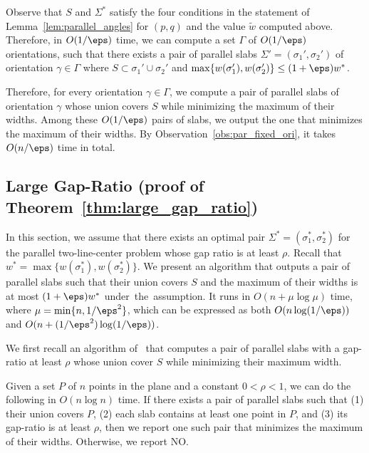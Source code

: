 Observe that $S$ and $\Sigma^*$ satisfy the four conditions in the statement of Lemma~\ref{lem:parallel_angles} for $(p, q)$ and the value $\widetilde w$ computed above.
Therefore, in $O(1/\eps)$ time, we can compute a set $\Gamma$ of $O(1/\eps)$ orientations, such that there exists a pair of parallel slabs $\Sigma' = (\sigma_1', \sigma_2')$  of orientation $\gamma \in \Gamma$ where $S\subset \sigma_1'\cup \sigma_2'$ and $\max \{w(\sigma_1'), w(\sigma_2') \} \le (1+\eps) w^*$.

Therefore, for every orientation $\gamma \in \Gamma$, we compute a pair of parallel slabs of orientation $\gamma$ whose union covers $S$ while minimizing the maximum of their widths. 
Among these $O(1/\eps)$ pairs of slabs, we output the one that minimizes the maximum of their widths.
By Observation~\ref{obs:par_fixed_ori}, it takes $O(n/\eps)$ time in total. 



\subsection{Large Gap-Ratio (proof of Theorem~\ref{thm:large_gap_ratio})}
\label{sec:large_gap_ratio}
In this section, we assume that there exists an optimal pair $\Sigma^* = (\sigma_1^*, \sigma_2^*)$ for the parallel two-line-center problem whose gap ratio is at least $\rho$. 
Recall that $w^* = \max \{w(\sigma_1^*), w(\sigma_2^*) \}$.
We present an algorithm that outputs a pair of parallel slabs such that their union covers $S$ and the maximum of their widths is at most $(1+\eps)w^*$ under~the~assumption. 
It runs in $O(n + \mu \log \mu)$ time, where $\mu = \min \{n, 1/\eps^2 \}$, which can be expressed as both $O(n \log (1/\eps))$ and $O(n + (1/\eps^2) \log (1/\eps))$. 

We first recall an algorithm of~\cite{chung2025parallel} that computes a pair of parallel slabs with a gap-ratio at least $\rho$ whose union cover $S$ while minimizing their maximum width.


\begin{theorem}
    \label{thm:large_gap_prev}
    Given a set $P$ of $n$ points in the plane and a constant $0< \rho < 1$, we can do the following in $O(n\log n)$ time. If there exists a pair of parallel slabs such that (1) their union covers $P$, (2) each slab contains at least one point in $P$, and (3) its gap-ratio is at least $\rho$, then we report one such pair that minimizes the maximum of their widths.
    Otherwise, we report NO.
\end{theorem}


